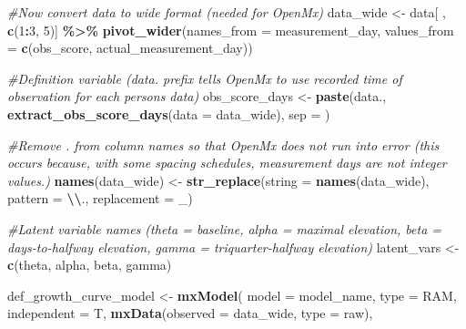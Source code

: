 \documentclass[
12pt, %
twoside,
english]{guelphthesis}
\newenvironment{Shaded}{\begin{snugshade}}{\end{snugshade}}
\newcommand{\AttributeTok}[1]{\textcolor[rgb]{0.13,0.29,0.53}{#1}}
\newcommand{\CommentTok}[1]{\textcolor[rgb]{0.56,0.35,0.01}{\textit{#1}}}
\newcommand{\DecValTok}[1]{\textcolor[rgb]{0.00,0.00,0.81}{#1}}
\newcommand{\FunctionTok}[1]{\textcolor[rgb]{0.13,0.29,0.53}{\textbf{#1}}}
\newcommand{\NormalTok}[1]{#1}
\newcommand{\OtherTok}[1]{\textcolor[rgb]{0.56,0.35,0.01}{#1}}
\newcommand{\SpecialCharTok}[1]{\textcolor[rgb]{0.81,0.36,0.00}{\textbf{#1}}}
\newcommand{\StringTok}[1]{\textcolor[rgb]{0.31,0.60,0.02}{#1}}
\begin{document}
\restoreparindent\label{definition-model}
\begin{Shaded}
\begin{Highlighting}[numbers=left,,]
\CommentTok{\#Now convert data to wide format (needed for OpenMx)}
\NormalTok{data\_wide }\OtherTok{\textless{}{-}}\NormalTok{ data[ , }\FunctionTok{c}\NormalTok{(}\DecValTok{1}\SpecialCharTok{:}\DecValTok{3}\NormalTok{, }\DecValTok{5}\NormalTok{)] }\SpecialCharTok{\%\textgreater{}\%} 
    \FunctionTok{pivot\_wider}\NormalTok{(}\AttributeTok{names\_from =}\NormalTok{ measurement\_day, }\AttributeTok{values\_from =} \FunctionTok{c}\NormalTok{(obs\_score, actual\_measurement\_day))}

\CommentTok{\#Definition variable (data. prefix tells OpenMx to use recorded time of observation for each person\textquotesingle{}s data)}
\NormalTok{obs\_score\_days }\OtherTok{\textless{}{-}} \FunctionTok{paste}\NormalTok{(}\StringTok{\textquotesingle{}data.\textquotesingle{}}\NormalTok{, }\FunctionTok{extract\_obs\_score\_days}\NormalTok{(}\AttributeTok{data =}\NormalTok{ data\_wide), }\AttributeTok{sep =} \StringTok{\textquotesingle{}\textquotesingle{}}\NormalTok{) }

\CommentTok{\#Remove . from column names so that OpenMx does not run into error (this occurs because, with some spacing schedules, measurement days are not integer values.) }
\FunctionTok{names}\NormalTok{(data\_wide) }\OtherTok{\textless{}{-}} \FunctionTok{str\_replace}\NormalTok{(}\AttributeTok{string =} \FunctionTok{names}\NormalTok{(data\_wide), }\AttributeTok{pattern =} \StringTok{\textquotesingle{}}\SpecialCharTok{\textbackslash{}\textbackslash{}}\StringTok{.\textquotesingle{}}\NormalTok{, }\AttributeTok{replacement =} \StringTok{\textquotesingle{}\_\textquotesingle{}}\NormalTok{)}

\CommentTok{\#Latent variable names (theta = baseline, alpha = maximal elevation, beta = days{-}to{-}halfway elevation, gamma = triquarter{-}halfway elevation)}
\NormalTok{latent\_vars }\OtherTok{\textless{}{-}} \FunctionTok{c}\NormalTok{(}\StringTok{\textquotesingle{}theta\textquotesingle{}}\NormalTok{, }\StringTok{\textquotesingle{}alpha\textquotesingle{}}\NormalTok{, }\StringTok{\textquotesingle{}beta\textquotesingle{}}\NormalTok{, }\StringTok{\textquotesingle{}gamma\textquotesingle{}}\NormalTok{) }

\NormalTok{def\_growth\_curve\_model }\OtherTok{\textless{}{-}} \FunctionTok{mxModel}\NormalTok{(}
  \AttributeTok{model =}\NormalTok{ model\_name,}
  \AttributeTok{type =} \StringTok{\textquotesingle{}RAM\textquotesingle{}}\NormalTok{, }\AttributeTok{independent =}\NormalTok{ T,}
  \FunctionTok{mxData}\NormalTok{(}\AttributeTok{observed =}\NormalTok{ data\_wide, }\AttributeTok{type =} \StringTok{\textquotesingle{}raw\textquotesingle{}}\NormalTok{),}
  

\end{Highlighting}
\end{Shaded}
\end{document}
